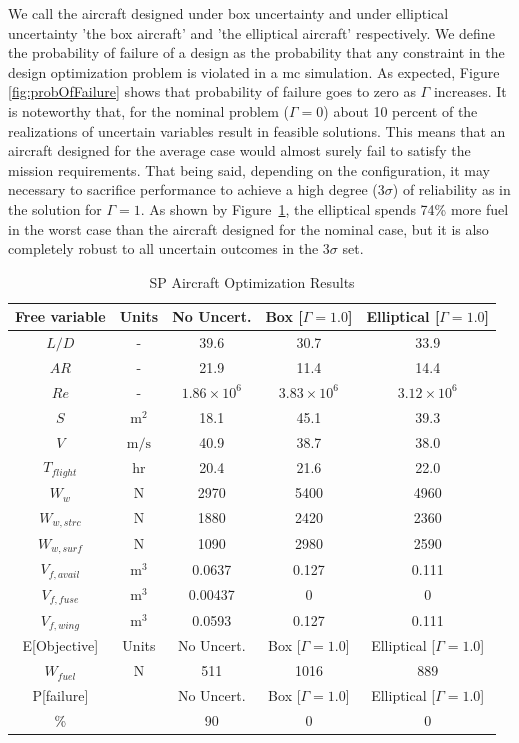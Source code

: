 We call the aircraft designed under box uncertainty and under elliptical uncertainty 'the box aircraft'
and 'the elliptical aircraft' respectively. We
define the probability of failure of a design as the probability that any constraint
in the design optimization problem is violated in a \gls{mc} simulation.
As expected, Figure \ref{fig:probOfFailure} shows that probability of failure goes to zero as $\Gamma$ increases.
It is noteworthy that, for the nominal problem ($\Gamma = 0$) about 10 percent of the realizations of
uncertain variables result in feasible solutions.
This means that an aircraft designed for the average case would almost surely
fail to satisfy the mission requirements.
That being said, depending on the configuration, it may necessary to sacrifice
performance to achieve a high degree ($3\sigma$) of
reliability as in the solution for $\Gamma = 1$. As shown by Figure~\ref{tab:results},
the elliptical spends 74\% more fuel
in the worst case than the aircraft designed for the nominal case, but it
is also completely robust to all uncertain outcomes in the $3\sigma$ set.

\begin{table}[!h]
\begin{center}
\caption{\label{tab:results} SP Aircraft Optimization Results}
\begin{tabular}{c c c c c}
\hline
Free variable & Units & No Uncert. & Box [$\Gamma = 1.0$] & Elliptical [$\Gamma = 1.0$] \\
\hline
$L/D$ & - & 39.6 & 30.7 & 33.9 \\
$AR$ & - & 21.9 & 11.4 & 14.4 \\
$Re$ & - & $1.86 \times 10^6$ & $3.83\times 10^6$ & $3.12 \times 10^6$ \\
$S$ & $\mathrm{m^2}$ & 18.1 & 45.1 & 39.3 \\
$V$ & $\mathrm{m/s}$ & 40.9 & 38.7 & 38.0 \\
$T_{flight}$ & $\mathrm{hr}$ & 20.4 & 21.6 & 22.0 \\
$W_w$ & $\mathrm{N}$ & 2970 & 5400 & 4960 \\
$W_{w,strc}$ & $\mathrm{N}$ & 1880 & 2420 & 2360 \\
$W_{w,surf}$ & $\mathrm{N}$ & 1090 & 2980 & 2590 \\
$V_{f,avail}$ & $\mathrm{m^3}$ & 0.0637 & 0.127 & 0.111 \\
$V_{f,fuse}$ & $\mathrm{m^3}$ & 0.00437 & 0 & 0 \\
$V_{f,wing}$ & $\mathrm{m^3}$ & 0.0593 & 0.127 & 0.111 \\
\hline
E[Objective] & Units & No Uncert. & Box [$\Gamma = 1.0$] & Elliptical [$\Gamma = 1.0$] \\
\hline
$W_{fuel}$ & $\mathrm{N}$ & 511 & 1016 & 889 \\
\hline
P[failure] & & No Uncert. & Box [$\Gamma = 1.0$] & Elliptical [$\Gamma = 1.0$] \\
\hline
\% & & 90 & 0 & 0\\
\hline
\end{tabular}
\end{center}
\end{table}

